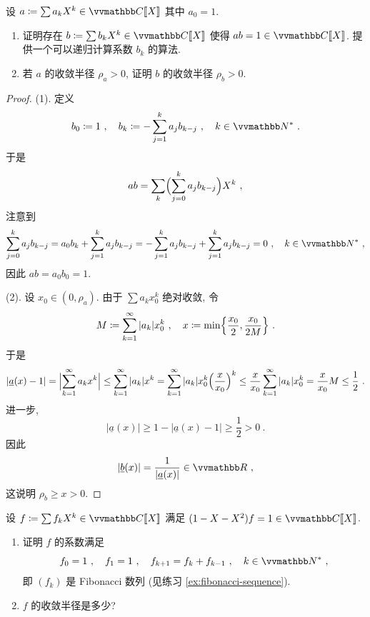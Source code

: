 \begin{exercise}
    设 \(a \coloneqq \sum a_k X^k \in \C[\![X]\!]\) 其中 \(a_0 = 1\).
    \begin{enumerate}
        \item 证明存在 \(b \coloneqq \sum b_k X^k \in \C[\![X]\!]\) 使得 \(a b = 1 \in \C[\![X]\!]\). 提供一个可以递归计算系数 \(b_k\) 的算法.
        \item 若 \(a\) 的收敛半径 \(\rho_a > 0\), 证明 \(b\) 的收敛半径 \(\rho_b > 0\).
    \end{enumerate}
\end{exercise}

\begin{proof}
    (1). 定义
    \[
        b_0 \coloneqq 1\ ,\quad b_k \coloneqq - \sum_{j = 1}^k a_j b_{k - j}\ ,\quad k \in \N^\ast\ .
    \]
    于是
    \[
        a b = \sum_k \Bigl(\sum_{j = 0}^k a_j b_{k - j}\Bigr) X^k\ ,
    \]
    注意到
    \[
        \sum_{j = 0}^k a_j b_{k - j} = a_0 b_k + \sum_{j = 1}^k a_j b_{k - j} = - \sum_{j = 1}^k a_j b_{k - j} + \sum_{j = 1}^k a_j b_{k - j} = 0\ ,\quad k \in \N^\ast\ ,
    \]
    因此 \(a b = a_0 b_0 = 1\).

    (2). 设 \(x_0 \in (0, \rho_a)\). 由于 \(\sum a_k x_0^k\) 绝对收敛, 令
    \[
        M \coloneqq \sum_{k = 1}^\infty |a_k| x_0^k\ ,\quad x \coloneqq \min \Bigl\{\frac{x_0}{2}, \frac{x_0}{2 M}\Bigr\}\ .
    \]
    于是
    \[
        |\underline a(x) - 1| = \Bigl|\sum_{k = 1}^\infty a_k x^k\Bigr| \leq \sum_{k = 1}^\infty |a_k| x^k = \sum_{k = 1}^\infty |a_k| x_0^k \Bigl(\frac{x}{x_0}\Bigr)^k \leq \frac{x}{x_0} \sum_{k = 1}^\infty |a_k| x_0^k = \frac{x}{x_0} M \leq \frac{1}{2}\ .
    \]
    进一步,
    \[
        |\underline a(x)| \geq 1 - |\underline a(x) - 1| \geq \frac{1}{2} > 0\ .
    \]
    因此
    \[
        |\underline b(x)| = \frac{1}{|\underline a(x)|} \in \R\ ,
    \]
    这说明 \(\rho_b \geq x > 0\).
\end{proof}

\begin{exercise}
    设 \(f \coloneqq \sum f_k X^k \in \C[\![X]\!]\) 满足 \((1 - X - X^2) f = 1 \in \C[\![X]\!]\).
    \begin{enumerate}
        \item 证明 \(f\) 的系数满足
        \[
            f_0 = 1\ ,\quad f_1 = 1\ ,\quad f_{k + 1} = f_k + f_{k - 1}\ ,\quad k \in \N^\ast\ ,
        \]
        即 \((f_k)\) 是 Fibonacci 数列 (见练习 \ref{ex:fibonacci-sequence}).
        \item \(f\) 的收敛半径是多少?
    \end{enumerate}
\end{exercise}

